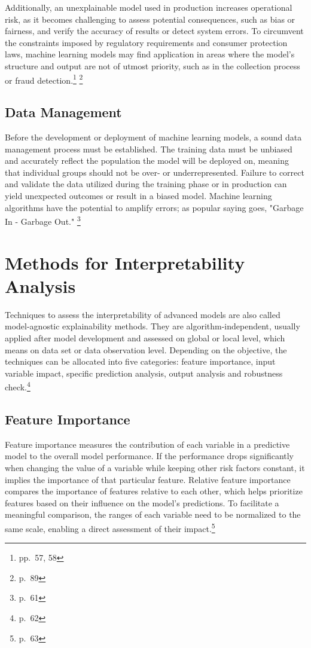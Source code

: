 Additionally, an unexplainable model used in production increases operational risk, as it becomes challenging to assess potential consequences, such as bias or fairness, and verify the accuracy of results or detect system errors. To circumvent the constraints imposed by regulatory requirements and consumer protection laws, machine learning models may find application in areas where the model's structure and output are not of utmost priority, such as in the collection process or fraud detection.\footnote{\cite{Roberts2022} pp.~57, 58} \footnote{\cite{Witzany:2017} p.~89}

\subsection{Data Management}
Before the development or deployment of machine learning models, a sound data management process must be established. The training data must be unbiased and accurately reflect the population the model will be deployed on, meaning that individual groups should not be over- or underrepresented. Failure to correct and validate the data utilized during the training phase or in production can yield unexpected outcomes or result in a biased model. Machine learning algorithms have the potential to amplify errors; as popular saying goes, "Garbage In - Garbage Out." \footnote{\cite{Roberts2022} p.~61}

\section{Methods for Interpretability Analysis}
Techniques to assess the interpretability of advanced models are also called model-agnostic explainability methods. They are algorithm-independent, usually applied after model development and assessed on global or local level, which means on data set or data observation level. Depending on the objective, the techniques can be allocated into five categories: feature importance, input variable impact, specific prediction analysis, output analysis and robustness check.\footnote{\cite{Roberts2022} p.~62}

\subsection{Feature Importance}
Feature importance measures the contribution of each variable in a predictive model to the overall model performance. If the performance drops significantly when changing the value of a variable while keeping other risk factors constant, it implies the importance of that particular feature. Relative feature importance compares the importance of features relative to each other, which helps prioritize features based on their influence on the model's predictions. To facilitate a meaningful comparison, the ranges of each variable need to be normalized to the same scale, enabling a direct assessment of their impact.\footnote{\cite{Roberts2022} p.~63}

